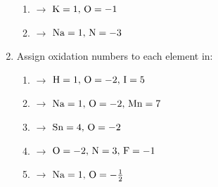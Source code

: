 \documentclass[12pt]{article}
\begin{document}
\begin{enumerate}
\begin{enumerate}
      \item {} $\rightarrow$ $\ce{K} = 1,\,\ce{O}=-1$

      \item {} $\rightarrow$ $\ce{Na} = 1,\,\ce{N}=-3$

    \end{enumerate}

  \item Assign oxidation numbers to each element in:

  \begin{enumerate}

      \item {} $\rightarrow$ $\ce{H} = 1,\,\ce{O}=-2,\,\ce{I}=5$

      \item {} $\rightarrow$ $\ce{Na} = 1,\,\ce{O}=-2,\,\ce{Mn}=7$

      \item {} $\rightarrow$ $\ce{Sn} = 4,\,\ce{O}=-2$

      \item {} $\rightarrow$ $\ce{O} = -2,\,\ce{N}=3,\,\ce{F}=-1$

      \item {} $\rightarrow$ $\ce{Na} = 1,\,\ce{O}=-\frac{1}{2}$

    \end{enumerate}


\end{enumerate}
\end{document}

